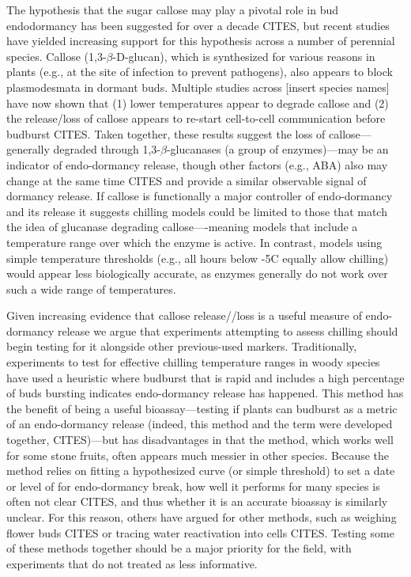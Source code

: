 \documentclass[11pt]{article}
\begin{document}
The hypothesis that the sugar callose may play a pivotal role in bud endodormancy has been suggested for over a decade CITES, but recent studies have yielded increasing support for this hypothesis across a number of perennial species. Callose (1,3-$\beta$-{\sc D}-glucan), which is synthesized for various reasons in plants (e.g., at the site of infection to prevent pathogens), also appears to block plasmodesmata in dormant buds. Multiple studies across [insert species names] have now shown that (1) lower temperatures appear to degrade callose and (2) the release/loss of callose appears to re-start cell-to-cell communication before budburst CITES. Taken together, these results suggest the loss of callose---generally degraded through 1,3-$\beta$-glucanases (a group of enzymes)---may be an indicator of endo-dormancy release, though other factors (e.g., ABA) also may change at the same time CITES and provide a similar observable signal of dormancy release. If callose is functionally a major controller of endo-dormancy and its release it suggests chilling models could be limited to those that match the idea of glucanase degrading callose----meaning models that include a temperature range over which the enzyme is active. In contrast, models using simple temperature thresholds (e.g., all hours below -5\degree C equally allow chilling) would appear less biologically accurate, as enzymes generally do not work over such a wide range of temperatures. 

Given increasing evidence that callose release//loss is a useful measure of endo-dormancy release we argue that experiments attempting to assess chilling should begin testing for it alongside other previous-used markers. Traditionally, experiments to test for effective chilling temperature ranges in woody species have used a heuristic where budburst that is rapid and includes a high percentage of buds bursting indicates endo-dormancy release has happened. This method has the benefit of being a useful bioassay---testing if plants can budburst as a metric of an endo-dormancy release (indeed, this method and the term were developed together, CITES)---but has disadvantages in that the method, which works well for some stone fruits, often appears much messier in other species. Because the method relies on fitting a hypothesized curve (or simple threshold) to set a date or level of for endo-dormancy break, how well it performs for many species is often not clear CITES, and thus whether it is an accurate bioassay is similarly unclear. For this reason, others have argued for other methods, such as weighing flower buds CITES or tracing water reactivation into cells CITES. Testing some of these methods together should be a major priority for the field, with experiments that do not treated as less informative. 
\end{document}
